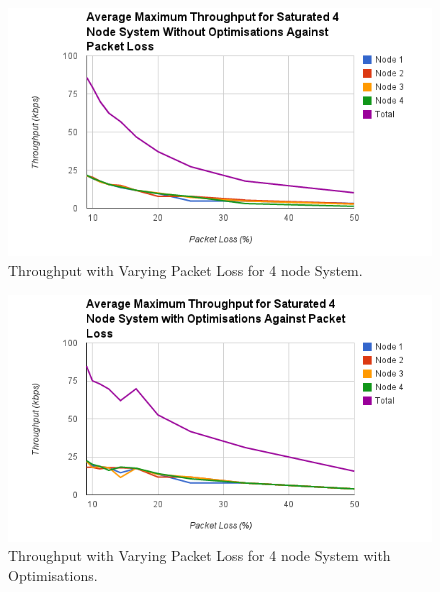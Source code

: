 \documentclass[parskip]{cs4rep}
\begin{document}
\begin{figure}
	\centering
	\includegraphics[width=120mm]{throughputvsloss.png}
	\caption{Throughput with Varying Packet Loss for 4 node System.}
	\label{fig:ThroughputVsLoss}
\end{figure}

\begin{figure}
	\centering
	\includegraphics[width=120mm]{throughputvslossopt.png}
	\caption{Throughput with Varying Packet Loss for 4 node System with Optimisations.}
	\label{fig:ThroughputVsLossOpt}
\end{figure}
\end{document}

